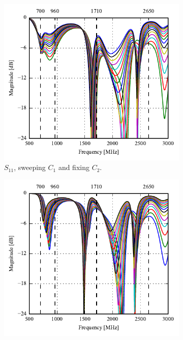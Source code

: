 \begin{figure}[htbp]
   \begin{subfigure}[b]{0.49\linewidth}
        \centering
        \includegraphics{img/tech_sol/monopole/prototype_v2/sim_s11}
        \caption{$S_{11}$, sweeping $C_1$ and fixing $C_2$.}
        \label{fig:ant1_proto_sim_s11}
    \end{subfigure}
    \hfill
    \begin{subfigure}[b]{0.49\linewidth}
        \centering
        \includegraphics{img/tech_sol/monopole/prototype_v2/sim_s22}

\end{subfigure}
\end{figure}
